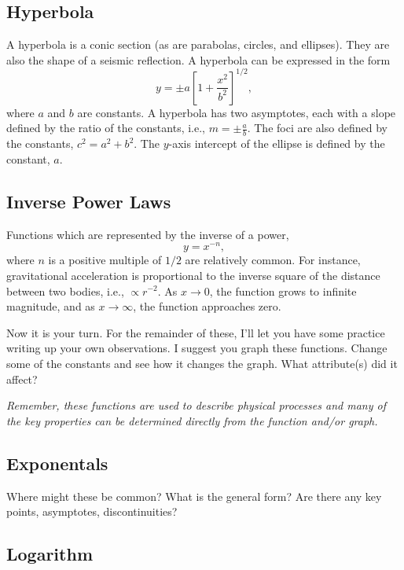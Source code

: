 \documentclass[final,a4paper,12pt]{article}
\theoremstyle{definition}
\begin{document}
\subsection{Hyperbola}
A hyperbola is a conic section (as are parabolas, circles, and ellipses).  They
are also the shape of a seismic reflection.  A hyperbola can be expressed in the
form
\begin{equation}
    y = \pm a \left[1 + \frac{x^2}{b^2} \right]^{1/2} ,
\end{equation}
where $a$ and $b$ are constants.  A hyperbola has two asymptotes, each with a
slope defined by the ratio of the constants, i.e., $m = \pm\frac{a}{b}$.  The
foci are also defined by the constants, $c^2 = a^2 + b^2$.  The $y$-axis
intercept of the ellipse is defined by the constant, $a$.

\subsection{Inverse Power Laws}
Functions which are represented by the inverse of a power,
\begin{equation}
    y = x^{-n} ,
\end{equation}
where $n$ is a positive multiple of $1/2$ are relatively common.  For instance,
gravitational acceleration is proportional to the inverse square of the
distance between two bodies, i.e., $\propto r^{-2}$.  As $x \to 0$,
the function grows to infinite magnitude, and as $x \to \infty$, the function
approaches zero.

Now it is your turn. For the remainder of these, I'll let you have some practice
writing up your own observations.  I suggest you graph these functions.  Change
some of the constants and see how it changes the graph.  What attribute(s) did
it affect?

{\it Remember, these functions are used to describe physical processes and many of
the key properties can be determined directly from the function and/or graph.}

\subsection{Exponentals}
Where might these be common?  What is the general form?  Are there any key
points, asymptotes, discontinuities?
\vspace{16ex}

\subsection{Logarithm}
\vspace{16ex}
\end{document}
